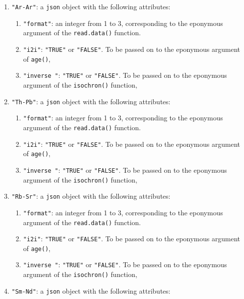 \begin{refsection}
\begin{enumerate}[leftmargin=\parindent,align=left,
      labelwidth=\parindent,label*=2.\arabic*.]
\item{\tt "Ar-Ar"}: a \texttt{json} object with the following
  attributes:
  \begin{enumerate}[leftmargin=\parindent,align=left,labelwidth=\parindent,label*=\arabic*.]
  \item{\tt "format"}: an integer from 1 to 3, corresponding to the
    eponymous argument of the \texttt{read.data()} function.
  \item{\tt "i2i"}: \texttt{"TRUE"} or \texttt{"FALSE"}. To be passed
    on to the eponymous argument of \texttt{age()},
  \item{\tt "inverse "}: \texttt{"TRUE"} or \texttt{"FALSE"}. To be
    passed on to the eponymous argument of the \texttt{isochron()}
    function,
  \end{enumerate}
\item{\tt "Th-Pb"}: a \texttt{json} object with the following
  attributes:
  \begin{enumerate}[leftmargin=\parindent,align=left,labelwidth=\parindent,label*=\arabic*.]
  \item{\tt "format"}: an integer from 1 to 3, corresponding to the
    eponymous argument of the \texttt{read.data()} function.
  \item{\tt "i2i"}: \texttt{"TRUE"} or \texttt{"FALSE"}. To be passed
    on to the eponymous argument of \texttt{age()},
  \item{\tt "inverse "}: \texttt{"TRUE"} or \texttt{"FALSE"}. To be
    passed on to the eponymous argument of the \texttt{isochron()}
    function,
  \end{enumerate}
\item{\tt "Rb-Sr"}: a \texttt{json} object with the following
  attributes:
  \begin{enumerate}[leftmargin=\parindent,align=left,labelwidth=\parindent,label*=\arabic*.]
  \item{\tt "format"}: an integer from 1 to 3, corresponding to the
    eponymous argument of the \texttt{read.data()} function.
  \item{\tt "i2i"}: \texttt{"TRUE"} or \texttt{"FALSE"}. To be passed
    on to the eponymous argument of \texttt{age()},
  \item{\tt "inverse "}: \texttt{"TRUE"} or \texttt{"FALSE"}. To be
    passed on to the eponymous argument of the \texttt{isochron()}
    function,
  \end{enumerate}
\item{\tt "Sm-Nd"}: a \texttt{json} object with the following
  attributes:
  \begin{enumerate}[leftmargin=\parindent,align=left,labelwidth=\parindent,label*=\arabic*.]

\end{enumerate}
\end{enumerate}
\end{refsection}

